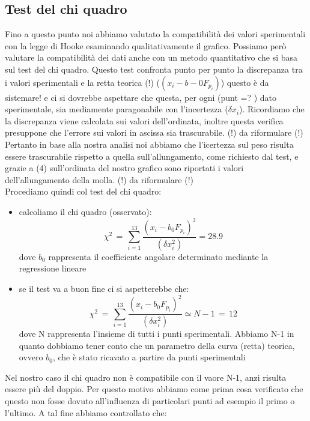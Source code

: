 \subsection{Test del chi quadro}
Fino a questo punto noi abbiamo valutato la compatibilità dei valori sperimentali con la legge di Hooke esaminando qualitativamente il grafico. Possiamo però valutare la compatibilità dei dati anche con un metodo quantitativo che si basa sul test del chi quadro. Questo test confronta punto per punto la discrepanza tra i valori sperimentali e la retta teorica
(!) ($(x_i - b-0 F_{p_i})$) questo è da sistemare!
 e ci si dovrebbe aspettare che questa, per ogni (punt =? ) dato sperimentale, sia mediamente paragonabile con l'incertezza ($\delta x_i$). Ricordiamo che la discrepanza viene calcolata sui valori dell'ordinata, inoltre questa verifica presuppone che l'errore sui valori in ascissa sia trascurabile.
(!) da riformulare (!) Pertanto in base alla nostra analisi noi abbiamo che l'icertezza sul peso risulta essere trascurabile rispetto  a quella sull'allungamento, come richiesto dal test, e grazie a (4) sull'ordinata del nostro grafico sono riportati i valori dell'allungamento della molla. (!) da riformulare (!)\\
Procediamo quindi col test del chi quadro:
\begin{itemize}
\item{calcoliamo il chi quadro (osservato):
	\begin{equation*}
		\chi^2 \,=\, \sum_{i=1}^{13} \frac{(x_i - b_0 F_{p_i})^2}{(\delta x_i^2)} = 28.9
	\end{equation*}
	dove $b_0$ rappresenta il coefficiente angolare determinato mediante la regressione lineare}
\item{se il test va a buon fine ci si aspetterebbe che:
	\begin{equation*}
		\chi^2 \,=\, \sum_{i=1}^{13} \frac{(x_i - b_0 F_{p_i})^2}{(\delta x_i^2)} \simeq N - 1 \,=\, 12
	\end{equation*}
	dove N rappresenta l'insieme di tutti i punti sperimentali. Abbiamo N-1 in quanto dobbiamo tener conto che un parametro della curva (retta) teorica, ovvero $b_0$, che è stato ricavato a partire da punti sperimentali}
\end{itemize}
Nel nostro caso il chi quadro non è compatibile con il vaore N-1, anzi risulta essere più del doppio.
Per questo motivo abbiamo come prima cosa verificato che questo non fosse dovuto all'influenza di particolari punti ad esempio il primo o l'ultimo. A tal fine abbiamo controllato che:

